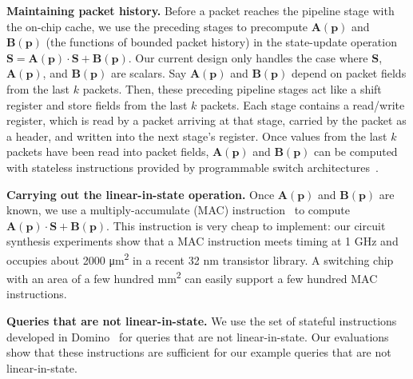 \textbf{Maintaining packet history.} Before a packet reaches the pipeline stage
with the on-chip cache, we use the preceding stages to precompute
$\boldsymbol{A}(\mathbf{p})$ and $\boldsymbol{B}(\mathbf{p})$ (the functions of bounded packet history)
in the state-update operation $\boldsymbol{S} =\boldsymbol{A}(\mathbf{p}) \cdot
\boldsymbol{S} + \boldsymbol{B}(\mathbf{p})$.
Our current design only handles the case
where $\boldsymbol{S}$, $\boldsymbol{A}(\mathbf{p})$, and $\boldsymbol{B}(\mathbf{p})$ are scalars. Say
$\boldsymbol{A}(\mathbf{p})$ and $\boldsymbol{B}(\mathbf{p})$ depend on packet fields from the last $k$
packets. Then, these preceding pipeline stages act like a shift register and
store fields from the last $k$ packets. Each stage contains a read/write
register, which is read by a packet arriving at that stage, carried
by the packet as a header, and written into the next stage's register. Once values from the last
$k$ packets have been read into packet fields, $\boldsymbol{A}(\mathbf{p})$ and
$\boldsymbol{B}(\mathbf{p})$ can be computed with stateless instructions provided by
programmable switch architectures~\cite{rmt, domino_sigcomm}.

\textbf{Carrying out the linear-in-state operation.} Once $\boldsymbol{A}(\mathbf{p})$ and
$\boldsymbol{B}(\mathbf{p})$ are known, we use a multiply-accumulate (MAC)
instruction~\cite{mac} to compute $\boldsymbol{A}(\mathbf{p}) \cdot \boldsymbol{S} +
\boldsymbol{B}(\mathbf{p})$. This instruction is very cheap to implement: our circuit
synthesis experiments show that a MAC instruction meets timing at 1 GHz and
occupies about 2000 \si{\micro\metre\squared} in a recent 32 nm transistor
library. A switching chip with an area of a few hundred
\si{\milli\meter\squared} can easily support a few hundred MAC instructions.

\textbf{Queries that are not linear-in-state.} We use the set of stateful
instructions developed in Domino~\cite{domino_sigcomm} for queries that are not
linear-in-state. Our evaluations show that these instructions are sufficient
for our example queries that are not linear-in-state.
